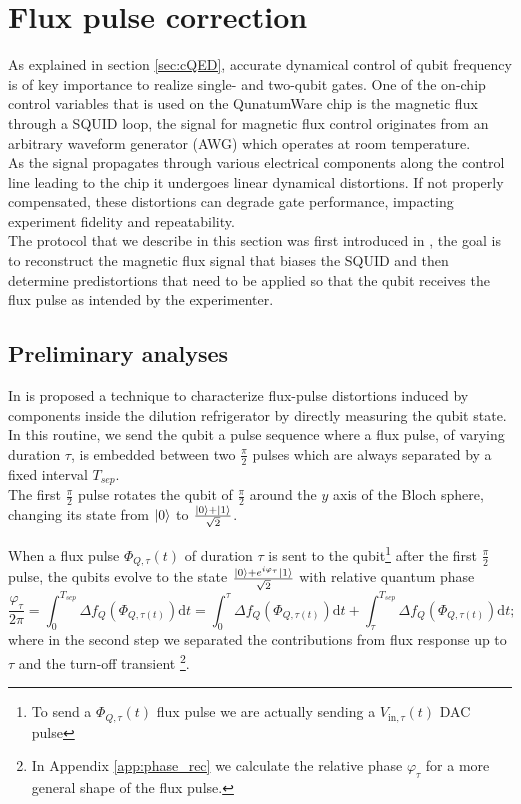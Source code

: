 \newpage
\restoregeometry

\section{Flux pulse correction}

As explained in section \ref{sec:cQED}, accurate dynamical control of qubit frequency is of key importance to realize single- and two-qubit gates.
One of the on-chip control variables that is used on the QunatumWare chip is the magnetic flux through a SQUID loop, the signal for magnetic flux control originates from an arbitrary waveform generator (AWG) which operates at room temperature.\\
As the signal propagates through various electrical components along the control line leading to the chip it undergoes linear dynamical distortions. 
If not properly compensated, these distortions can degrade gate performance, impacting experiment fidelity and repeatability.\\

The protocol that we describe in this section was first introduced in \cite{rol_time-domain_2020}, the goal is to reconstruct the magnetic flux signal that biases the SQUID and then determine predistortions that need to be applied so that the qubit receives the flux pulse as intended by the experimenter.

\subsection{Preliminary analyses}\label{subsec:preliminary}

In \cite{rol_time-domain_2020} is proposed a technique to characterize flux-pulse distortions induced by components inside the dilution refrigerator by directly measuring the qubit state.
In this routine, we send the qubit a pulse sequence where a flux pulse, of varying duration $\tau$, is embedded between two $\frac{\pi}{2}$ pulses which are always separated by a fixed interval $T_{sep}$.\\
The first $\frac{\pi}{2}$ pulse rotates the qubit of $\frac{\pi}{2}$ around the $y$ axis of the Bloch sphere, changing its state from $\ket{0}$ to $\frac{\ket{0}+\ket{1}}{\sqrt{2}}$.

When a flux pulse $\Phi_{Q,\tau}(t)$ of duration $\tau$ is sent to the qubit\footnote{To send a $\Phi_{Q,\tau}(t)$ flux pulse we are actually sending a $V_{\text{in},\tau}(t)$ DAC pulse} after the first $\frac{\pi}{2}$ pulse, the qubits evolve to the state $\frac{\ket{0}+e^{i\varphi_\tau}\ket{1}}{\sqrt{2}}$ with relative quantum phase 
\begin{equation}\label{eq:phi}
    \frac{\varphi_{\tau}}{2\pi} = \int_{0}^{T_{sep}} \Delta f_Q (\Phi_{Q,\tau(t)})\text{d}t = \int_{0}^{\tau} \Delta f_Q (\Phi_{Q,\tau(t)})\text{d}t + \int_{\tau}^{T_{sep}} \Delta f_Q (\Phi_{Q,\tau(t)})\text{d}t;
\end{equation}
where in the second step we separated the contributions from flux response up to $\tau$ and the turn-off transient \footnote{In Appendix \ref{app:phase_rec} we calculate the relative phase $\varphi_{\tau}$ for a more general shape of the flux pulse.}. 

